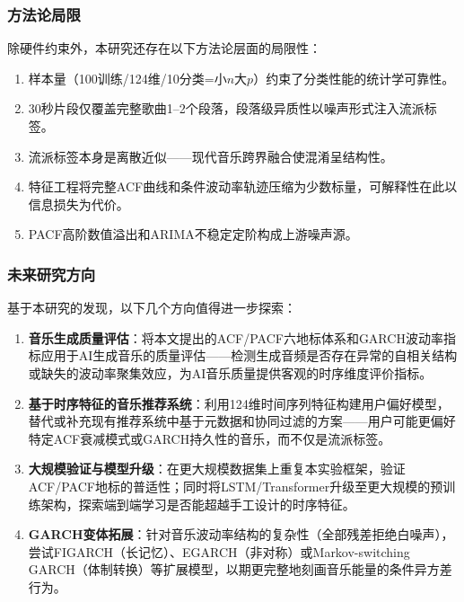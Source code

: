 \documentclass[12pt,a4paper]{article}
\begin{document}
\subsubsection*{方法论局限}

除硬件约束外，本研究还存在以下方法论层面的局限性：

\begin{enumerate}[itemsep=2pt]
    \item 样本量（100训练/124维/10分类=小$n$大$p$）约束了分类性能的统计学可靠性。
    \item 30秒片段仅覆盖完整歌曲1--2个段落，段落级异质性以噪声形式注入流派标签。
    \item 流派标签本身是离散近似——现代音乐跨界融合使混淆呈结构性。
    \item 特征工程将完整ACF曲线和条件波动率轨迹压缩为少数标量，可解释性在此以信息损失为代价。
    \item PACF高阶数值溢出和ARIMA不稳定定阶构成上游噪声源。
\end{enumerate}

\subsubsection*{未来研究方向}

基于本研究的发现，以下几个方向值得进一步探索：

\begin{enumerate}[itemsep=2pt]
    \item \textbf{音乐生成质量评估}：将本文提出的ACF/PACF六地标体系和GARCH波动率指标应用于AI生成音乐的质量评估——检测生成音频是否存在异常的自相关结构或缺失的波动率聚集效应，为AI音乐质量提供客观的时序维度评价指标。
    \item \textbf{基于时序特征的音乐推荐系统}：利用124维时间序列特征构建用户偏好模型，替代或补充现有推荐系统中基于元数据和协同过滤的方案——用户可能更偏好特定ACF衰减模式或GARCH持久性的音乐，而不仅是流派标签。
    \item \textbf{大规模验证与模型升级}：在更大规模数据集上重复本实验框架，验证ACF/PACF地标的普适性；同时将LSTM/Transformer升级至更大规模的预训练架构，探索端到端学习是否能超越手工设计的时序特征。
    \item \textbf{GARCH变体拓展}：针对音乐波动率结构的复杂性（全部残差拒绝白噪声），尝试FIGARCH（长记忆）、EGARCH（非对称）或Markov-switching GARCH（体制转换）等扩展模型，以期更完整地刻画音乐能量的条件异方差行为。
\end{enumerate}

\FloatBarrier
\end{document}
